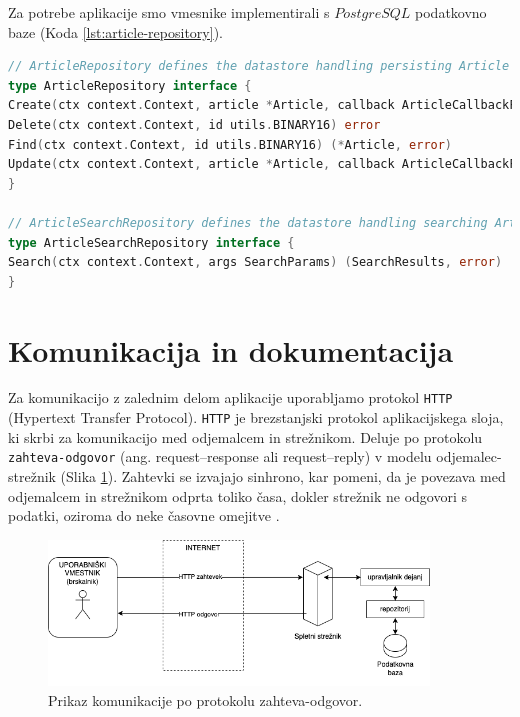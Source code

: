 \documentclass[a4paper, 12pt]{book}
\begin{document}
Za potrebe aplikacije smo vmesnike implementirali s $PostgreSQL$ podatkovno baze (Koda \ref{lst:article-repository}).
\begin{lstlisting}[language=go, style=mystyle,caption={Vmesnik, ki definira repozitorij za publikacije.},label=lst:article-repository]
// ArticleRepository defines the datastore handling persisting Article records.
type ArticleRepository interface {
Create(ctx context.Context, article *Article, callback ArticleCallbackFn) (*Article, error)
Delete(ctx context.Context, id utils.BINARY16) error
Find(ctx context.Context, id utils.BINARY16) (*Article, error)
Update(ctx context.Context, article *Article, callback ArticleCallbackFn) (*Article, error)
}

// ArticleSearchRepository defines the datastore handling searching Article records.
type ArticleSearchRepository interface {
Search(ctx context.Context, args SearchParams) (SearchResults, error)
}
\end{lstlisting}

\section{Komunikacija in dokumentacija}
Za komunikacijo z zalednim delom aplikacije uporabljamo protokol \verb=HTTP= (Hypertext Transfer Protocol). \verb=HTTP= je brezstanjski protokol aplikacijskega sloja, ki skrbi za komunikacijo med odjemalcem in strežnikom. Deluje po protokolu \verb=zahteva-odgovor= (ang. request–response ali request–reply) v modelu odjemalec-strežnik (Slika \ref{communication-flow}). Zahtevki se izvajajo sinhrono, kar pomeni, da je povezava med odjemalcem in strežnikom odprta toliko časa, dokler strežnik ne odgovori s podatki, oziroma do neke časovne omejitve \cite{http-rfc}.


\begin{figure}[h]
\begin{center}
\includegraphics[width=0.9\textwidth]{slike/communication.png}
\end{center}
\caption{ Prikaz komunikacije po protokolu zahteva-odgovor. }
\label{communication-flow}
\end{figure}
\end{document}
